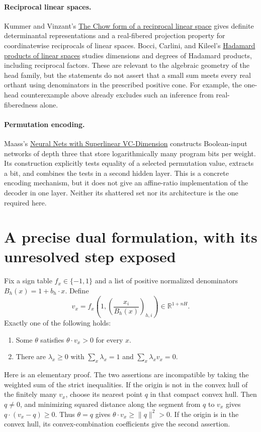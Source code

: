 \documentclass[11pt]{article}
\begin{document}
\paragraph{Reciprocal linear spaces.}
Kummer and Vinzant's
\href{https://arxiv.org/abs/1610.04584}{The Chow form of a reciprocal linear space}
gives definite determinantal representations and a real-fibered projection
property for coordinatewise reciprocals of linear spaces. Bocci, Carlini,
and Kileel's
\href{https://web.ma.utexas.edu/users/jkileel/HadamardPublished.pdf}{Hadamard products of linear spaces}
studies dimensions and degrees of Hadamard products, including reciprocal
factors. These are relevant to the algebraic geometry of the head family,
but the statements do not assert that a small sum meets every real orthant
using denominators in the prescribed positive cone.
For example, the one-head counterexample above already excludes such an
inference from real-fiberedness alone.

\paragraph{Permutation encoding.}
Maass's
\href{https://igi-web.tugraz.at/people/maass/psfiles/66a.pdf}{Neural Nets with Superlinear VC-Dimension}
constructs Boolean-input networks of depth three that store logarithmically
many program bits per weight. Its construction explicitly tests equality
of a selected permutation value, extracts a bit, and combines the tests
in a second hidden layer. This is a concrete encoding mechanism, but it
does not give an affine-ratio implementation of the decoder in one layer.
Neither its shattered set nor its architecture is the one required here.

\section{A precise dual formulation, with its unresolved step exposed}

Fix a sign table $f_x\in\{-1,1\}$ and a list of positive normalized
denominators $B_h(x)=1+b_h\cdot x$. Define
\[
 v_x=f_x\left(1,\left(\frac{x_i}{B_h(x)}\right)_{h,i}\right)
       \in\mathbb R^{1+nH}.
\]
Exactly one of the following holds:
\begin{enumerate}
\item Some $\theta$ satisfies $\theta\cdot v_x>0$ for every $x$.
\item There are $\lambda_x\ge0$ with $\sum_x\lambda_x=1$ and
      $\sum_x\lambda_xv_x=0$.
\end{enumerate}
Here is an elementary proof. The two assertions are incompatible by
taking the weighted sum of the strict inequalities. If the origin is not
in the convex hull of the finitely many $v_x$, choose its nearest point
$q$ in that compact convex hull. Then $q\ne0$, and minimizing squared
distance along the segment from $q$ to $v_x$ gives
$q\cdot(v_x-q)\ge0$. Thus $\theta=q$ gives
$\theta\cdot v_x\ge\|q\|^2>0$. If the origin is in the convex hull,
its convex-combination coefficients give the second assertion.
\end{document}

